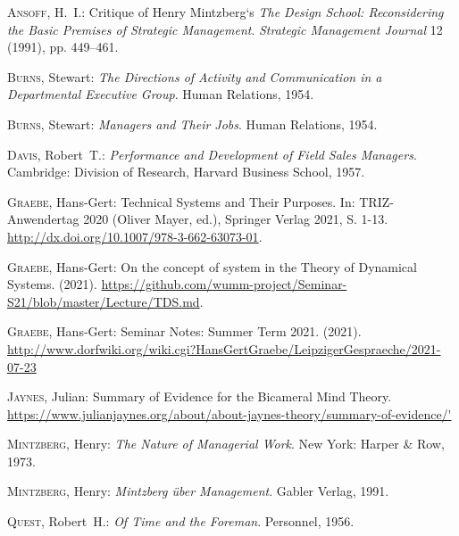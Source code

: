 \documentclass[a4paper,12pt]{article}
\begin{document}
\begin{thebibliography}{Gra21b}

 \textsc{Ansoff}, H.~I.: \newblock Critique of Henry
  Mintzberg‘s \emph{The Design School: Reconsidering the Basic Premises of
  Strategic Management}.  \emph{Strategic Management Journal}
  12 (1991), pp. 449--461.

 \textsc{Burns}, Stewart: \newblock \emph{The
  Directions of Activity and Communication in a Departmental Executive Group}.
  \newblock Human Relations, 1954.

 \textsc{Burns}, Stewart: \newblock \emph{Managers
  and Their Jobs}.  \newblock Human Relations, 1954.

 \textsc{Davis}, Robert~T.: \newblock \emph{Performance
  and Development of Field Sales Managers}.  \newblock Cambridge: Division of
  Research, Harvard Business School, 1957.

 \textsc{Graebe}, Hans-Gert: \newblock Technical
  Systems and Their Purposes.  \newblock In: TRIZ-Anwendertag 2020 (Oliver
  Mayer, ed.), Springer Verlag 2021, S. 1-13. \newblock
  \url{http://dx.doi.org/10.1007/978-3-662-63073-01}.

 \textsc{Graebe}, Hans-Gert: \newblock On the
  concept of system in the Theory of Dynamical Systems.  \newblock (2021).
  \newblock
  \url{https://github.com/wumm-project/Seminar-S21/blob/master/Lecture/TDS.md}.
  
 \textsc{Graebe}, Hans-Gert: \newblock Seminar Notes:
  Summer Term 2021.  \newblock (2021).  \newblock
  \url{http://www.dorfwiki.org/wiki.cgi?HansGertGraebe/LeipzigerGespraeche/2021-07-23}

 \textsc{Jaynes}, Julian: \newblock Summary of Evidence
  for the Bicameral Mind Theory.  \newblock
  \url{https://www.julianjaynes.org/about/about-jaynes-theory/summary-of-evidence/'}

 \textsc{Mintzberg}, Henry: \newblock \emph{The
  Nature of Managerial Work}.  \newblock New York: Harper \& Row, 1973.

 \textsc{Mintzberg}, Henry: \newblock
  \emph{Mintzberg über Management}.  \newblock Gabler Verlag, 1991.

 \textsc{Quest}, Robert~H.: \newblock \emph{Of Time and
  the Foreman}.  \newblock Personnel, 1956.


\end{thebibliography}
\end{document}
